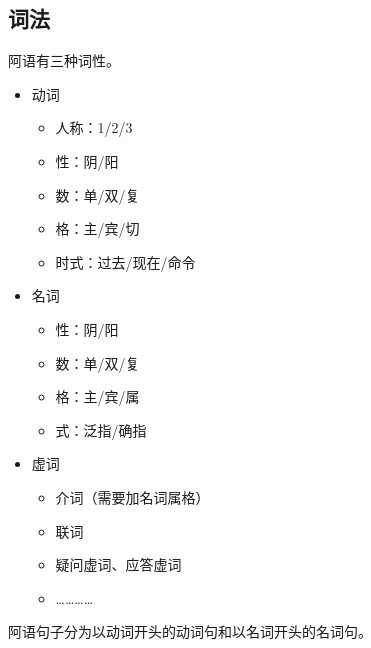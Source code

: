 \subsection{词法}

阿语有三种词性。

\begin{itemize}
    \item 动词
    \begin{itemize}
        \item 人称：1/2/3
        \item 性：阴/阳
        \item 数：单/双/复
        \item 格：主/宾/切
        \item 时式：过去/现在/命令
    \end{itemize}
    \item 名词
    \begin{itemize}
        \item 性：阴/阳
        \item 数：单/双/复
        \item 格：主/宾/属
        \item 式：泛指/确指
    \end{itemize}
    \item 虚词
    \begin{itemize}
        \item 介词（需要加名词属格）
        \item 联词
        \item 疑问虚词、应答虚词
        \item …………
    \end{itemize}
\end{itemize}

阿语句子分为以动词开头的动词句和以名词开头的名词句。